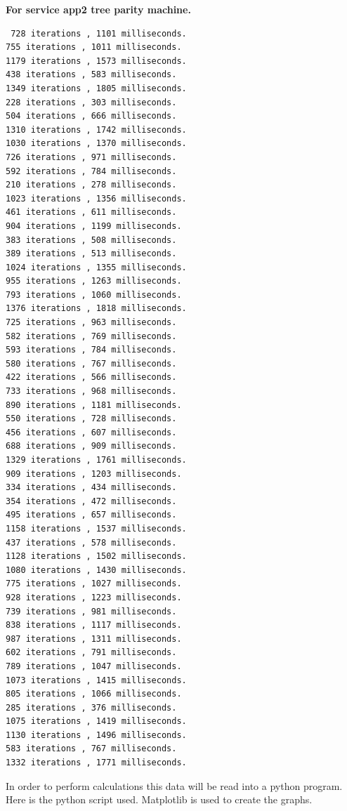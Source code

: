 \textbf{For service app2 tree parity machine.}
\begin{lstlisting}
 728 iterations , 1101 milliseconds.
755 iterations , 1011 milliseconds.
1179 iterations , 1573 milliseconds.
438 iterations , 583 milliseconds.
1349 iterations , 1805 milliseconds.
228 iterations , 303 milliseconds.
504 iterations , 666 milliseconds.
1310 iterations , 1742 milliseconds.
1030 iterations , 1370 milliseconds.
726 iterations , 971 milliseconds.
592 iterations , 784 milliseconds.
210 iterations , 278 milliseconds.
1023 iterations , 1356 milliseconds.
461 iterations , 611 milliseconds.
904 iterations , 1199 milliseconds.
383 iterations , 508 milliseconds.
389 iterations , 513 milliseconds.
1024 iterations , 1355 milliseconds.
955 iterations , 1263 milliseconds.
793 iterations , 1060 milliseconds.
1376 iterations , 1818 milliseconds.
725 iterations , 963 milliseconds.
582 iterations , 769 milliseconds.
593 iterations , 784 milliseconds.
580 iterations , 767 milliseconds.
422 iterations , 566 milliseconds.
733 iterations , 968 milliseconds.
890 iterations , 1181 milliseconds.
550 iterations , 728 milliseconds.
456 iterations , 607 milliseconds.
688 iterations , 909 milliseconds.
1329 iterations , 1761 milliseconds.
909 iterations , 1203 milliseconds.
334 iterations , 434 milliseconds.
354 iterations , 472 milliseconds.
495 iterations , 657 milliseconds.
1158 iterations , 1537 milliseconds.
437 iterations , 578 milliseconds.
1128 iterations , 1502 milliseconds.
1080 iterations , 1430 milliseconds.
775 iterations , 1027 milliseconds.
928 iterations , 1223 milliseconds.
739 iterations , 981 milliseconds.
838 iterations , 1117 milliseconds.
987 iterations , 1311 milliseconds.
602 iterations , 791 milliseconds.
789 iterations , 1047 milliseconds.
1073 iterations , 1415 milliseconds.
805 iterations , 1066 milliseconds.
285 iterations , 376 milliseconds.
1075 iterations , 1419 milliseconds.
1130 iterations , 1496 milliseconds.
583 iterations , 767 milliseconds.
1332 iterations , 1771 milliseconds.

\end{lstlisting}

In order to perform calculations this data will be read into a python program. Here is the python script used. Matplotlib is used to create the graphs.

